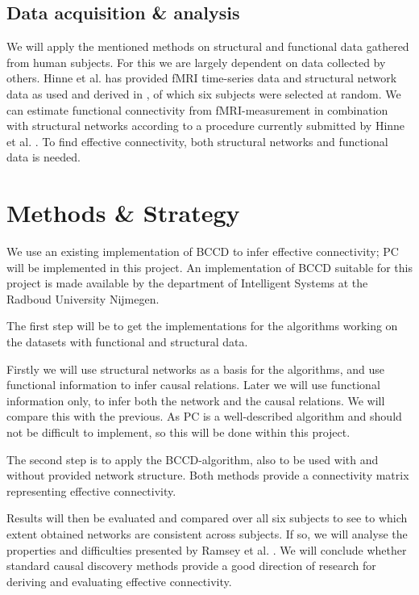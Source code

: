 \documentclass[a4paper, 10pt, english, twocolumn]{article}
\begin{document}
\subsection*{Data acquisition \& analysis}
We will apply the mentioned methods on structural and functional data gathered from human subjects.
For this we are largely dependent on data collected by others.
Hinne et al. has provided fMRI time-series data and structural network data as used and derived in \cite{hinne2013}, of which six subjects were selected at random.
We can estimate functional connectivity from fMRI-measurement in combination with structural 
networks according to a procedure currently submitted by Hinne et al. \cite{hinne2013submitted}.
To find effective connectivity, both structural networks and functional data is needed.

\section{Methods \& Strategy}
We use an existing implementation of BCCD to infer effective connectivity; PC will be implemented in this project.
An implementation of BCCD suitable for this project is made available by the department of Intelligent Systems at the Radboud University Nijmegen.

The first step will be to get the implementations for the algorithms working on the datasets with functional and structural data.

Firstly we will use structural networks as a basis for the algorithms, and use functional information to infer causal relations.
Later we will use functional information only, to infer both the network and the causal relations.
We will compare this with the previous.
As PC is a well-described algorithm \cite{spirtes2000} and should not be difficult to implement, so this will be done within this project.

The second step is to apply the BCCD-algorithm, also to be used with and without provided network structure.
Both methods provide a connectivity matrix representing effective connectivity.

Results will then be evaluated and compared over all six subjects to see to which extent obtained networks are consistent across subjects.
If so, we will analyse the properties and difficulties presented by Ramsey et al. \cite{ramsey2010}.
We will conclude whether standard causal discovery methods provide a good direction of research for deriving and evaluating effective connectivity.
\end{document}
